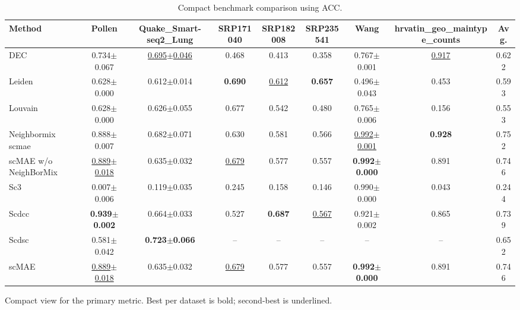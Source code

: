\begin{table}[t]
\centering
\scriptsize
\caption{Compact benchmark comparison using ACC.}
\label{tab:benchmark\_compact\_primary}
\begin{tabular}{lcccccccc}
\toprule
Method & Pollen & Quake\_Smart-seq2\_Lung & SRP171040 & SRP182008 & SRP235541 & Wang & hrvatin\_geo\_maintype\_counts & Avg. \\
\midrule
DEC & 0.734$\pm$0.067 & \underline{0.695$\pm$0.046} & 0.468 & 0.413 & 0.358 & 0.767$\pm$0.001 & \underline{0.917} & 0.622 \\
Leiden & 0.628$\pm$0.000 & 0.612$\pm$0.014 & \textbf{0.690} & \underline{0.612} & \textbf{0.657} & 0.496$\pm$0.043 & 0.453 & 0.593 \\
Louvain & 0.628$\pm$0.000 & 0.626$\pm$0.055 & 0.677 & 0.542 & 0.480 & 0.765$\pm$0.006 & 0.156 & 0.553 \\
Neighbormix scmae & 0.888$\pm$0.007 & 0.682$\pm$0.071 & 0.630 & 0.581 & 0.566 & \underline{0.992$\pm$0.001} & \textbf{0.928} & 0.752 \\
scMAE w/o NeighBorMix & \underline{0.889$\pm$0.018} & 0.635$\pm$0.032 & \underline{0.679} & 0.577 & 0.557 & \textbf{0.992$\pm$0.000} & 0.891 & 0.746 \\
Sc3 & 0.007$\pm$0.006 & 0.119$\pm$0.035 & 0.245 & 0.158 & 0.146 & 0.990$\pm$0.000 & 0.043 & 0.244 \\
Scdcc & \textbf{0.939$\pm$0.002} & 0.664$\pm$0.033 & 0.527 & \textbf{0.687} & \underline{0.567} & 0.921$\pm$0.002 & 0.865 & 0.739 \\
Scdsc & 0.581$\pm$0.042 & \textbf{0.723$\pm$0.066} & -- & -- & -- & -- & -- & 0.652 \\
scMAE & \underline{0.889$\pm$0.018} & 0.635$\pm$0.032 & \underline{0.679} & 0.577 & 0.557 & \textbf{0.992$\pm$0.000} & 0.891 & 0.746 \\
\bottomrule
\end{tabular}
\vspace{2pt}
\footnotesize Compact view for the primary metric. Best per dataset is bold; second-best is underlined.
\end{table}

